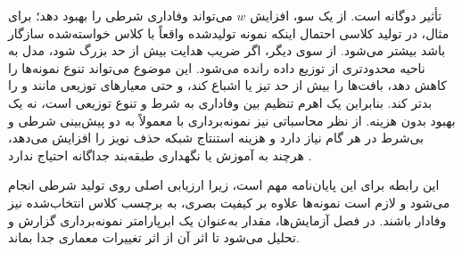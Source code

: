 تأثیر  دوگانه است. از یک سو، افزایش $w$ می‌تواند وفاداری شرطی را بهبود دهد؛ برای مثال، در تولید کلاسی  احتمال اینکه نمونه تولیدشده واقعاً با کلاس خواسته‌شده سازگار باشد بیشتر می‌شود. از سوی دیگر، اگر ضریب هدایت بیش از حد بزرگ شود، مدل به ناحیه محدودتری از توزیع داده رانده می‌شود. این موضوع می‌تواند تنوع نمونه‌ها را کاهش دهد، بافت‌ها را بیش از حد تیز یا اشباع کند، و حتی معیارهای توزیعی مانند  و  را بدتر کند. بنابراین  یک اهرم تنظیم بین وفاداری به شرط و تنوع توزیعی است، نه یک بهبود بدون هزینه. از نظر محاسباتی نیز نمونه‌برداری با  معمولاً به دو پیش‌بینی شرطی و بی‌شرط در هر گام نیاز دارد و هزینه استنتاج شبکه حذف نویز را افزایش می‌دهد، هرچند به آموزش یا نگهداری طبقه‌بند جداگانه احتیاج ندارد \cite{ho2022classifierFreeGuidance}.

این رابطه برای این پایان‌نامه مهم است، زیرا ارزیابی اصلی روی تولید شرطی  انجام می‌شود و لازم است نمونه‌ها علاوه بر کیفیت بصری، به برچسب کلاس انتخاب‌شده نیز وفادار باشند. در فصل آزمایش‌ها، مقدار  به‌عنوان یک ابرپارامتر نمونه‌برداری گزارش و تحلیل می‌شود تا اثر آن از اثر تغییرات معماری  جدا بماند.

\begin{table}[htbp]
    \centering
    \caption[مقایسه چارچوب‌های اصلی مدل‌های انتشار]{مقایسه چارچوب‌های اصلی مدل‌های انتشار}
    \label{tab:ch2-diffusion-frameworks}
\end{table}

